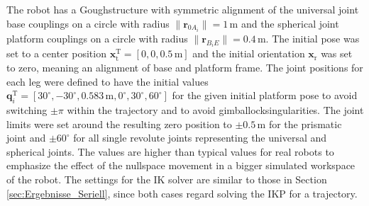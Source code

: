 \documentclass[robotics,article,accept,moreauthors,pdftex]{Definitions/mdpi}
\newcommand{\bm}[1]{\boldsymbol{#1}}
\newcommand{\transp}[0]{{\mathrm{T}}}
\begin{document}
The robot has a Gough\replaced[id=Sp]{ }{-}structure \cite{Merlet2006} with symmetric alignment of the universal joint base couplings on a circle with radius $\lVert\bm{r}_{0A_i}\rVert=1\,\mathrm{m}$ and the spherical joint platform couplings on a circle with radius $\lVert\bm{r}_{B_iE}\rVert=0.4\,\mathrm{m}$.
The initial pose was set to a center position $\bm{x}_\mathrm{t}^\transp=[0,0,0.5\,\mathrm{m}]$ and the initial orientation $\bm{x}_\mathrm{r}$ was set to zero, meaning an alignment of base and platform frame.
The joint positions for each leg were defined to have the initial values $\bm{q}_i^\transp=[30^\circ,-30^\circ,0.583\,\mathrm{m},0^\circ,30^\circ,60^\circ]$ for the given initial platform pose to avoid switching $\pm\pi$ within the trajectory and to avoid gimbal\replaced[id=Sp]{ }{-}lock\replaced[id=Sp]{ }{-}singularities.
The joint limits were set around the resulting zero position to $\pm0.5\,\mathrm{m}$ for the prismatic joint and $\pm60^\circ$ for all single revolute joints representing the universal and spherical joints.
The values are higher than typical values for real robots to emphasize the effect of the nullspace movement in a bigger simulated workspace of the robot.
The settings for the IK solver are similar to those in Section\,\ref{sec:Ergebnisse_Seriell}, since both cases regard solving the IKP for a trajectory.
\end{document}

